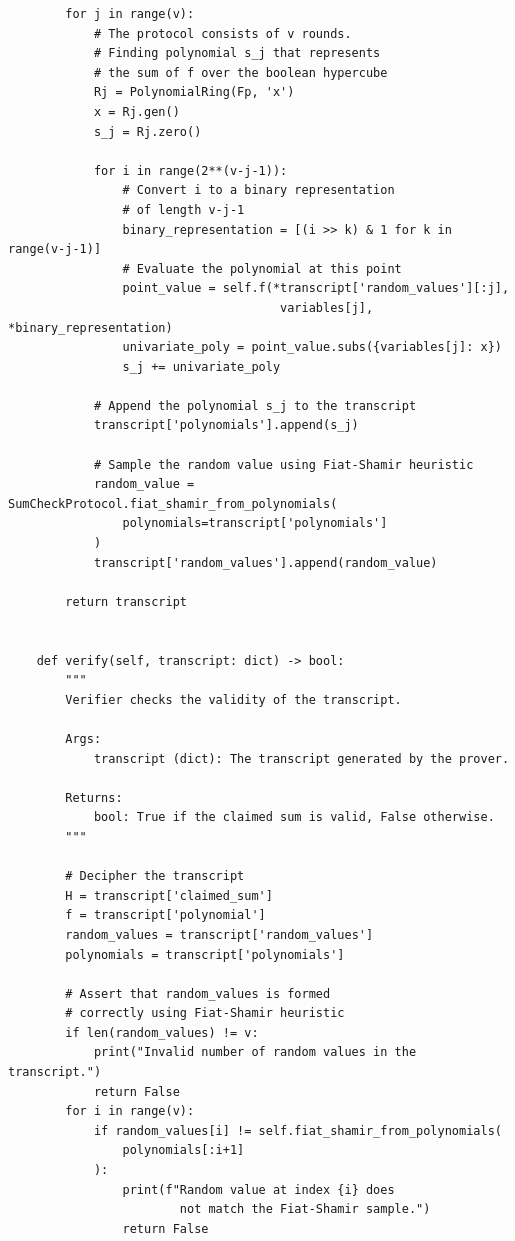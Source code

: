\documentclass[../../book.tex]{subfiles}
\begin{document}
\begin{verbatim}
        for j in range(v):
            # The protocol consists of v rounds.
            # Finding polynomial s_j that represents 
            # the sum of f over the boolean hypercube
            Rj = PolynomialRing(Fp, 'x')
            x = Rj.gen()
            s_j = Rj.zero()

            for i in range(2**(v-j-1)):
                # Convert i to a binary representation 
                # of length v-j-1
                binary_representation = [(i >> k) & 1 for k in range(v-j-1)]
                # Evaluate the polynomial at this point
                point_value = self.f(*transcript['random_values'][:j], 
                                      variables[j], *binary_representation)
                univariate_poly = point_value.subs({variables[j]: x})
                s_j += univariate_poly

            # Append the polynomial s_j to the transcript
            transcript['polynomials'].append(s_j)

            # Sample the random value using Fiat-Shamir heuristic
            random_value = SumCheckProtocol.fiat_shamir_from_polynomials(
                polynomials=transcript['polynomials']
            )
            transcript['random_values'].append(random_value)

        return transcript


    def verify(self, transcript: dict) -> bool:
        """
        Verifier checks the validity of the transcript.

        Args:
            transcript (dict): The transcript generated by the prover.

        Returns:
            bool: True if the claimed sum is valid, False otherwise.
        """
        
        # Decipher the transcript
        H = transcript['claimed_sum']
        f = transcript['polynomial']
        random_values = transcript['random_values']
        polynomials = transcript['polynomials']

        # Assert that random_values is formed 
        # correctly using Fiat-Shamir heuristic
        if len(random_values) != v:
            print("Invalid number of random values in the transcript.")
            return False
        for i in range(v):
            if random_values[i] != self.fiat_shamir_from_polynomials(
                polynomials[:i+1]
            ):
                print(f"Random value at index {i} does 
                        not match the Fiat-Shamir sample.")
                return False


\end{verbatim}
\end{document}
